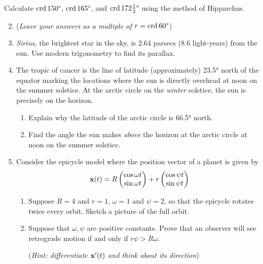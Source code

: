 \begin{exercises}{}{}
	\exstart %
	Calculate $\crd\ang{150}$, $\crd\ang{165}$, and $\crd\ang{172\tfrac 12}$ using the method of Hipparchus.\vspace{-5pt}
	\begin{enumerate}\setcounter{enumi}{1}
	  \item[](\emph{Leave your answers as a multiple of $r=\crd\ang{60}$})
	  
	  \item \emph{Sirius,} the brightest star in the sky, is 2.64 parsecs (8.6 light-years) from the sun. Use modern trigonometry to find its parallax.
	
		\item\label{exs:tropicstick1} The tropic of cancer is the line of latitude (approximately) \ang{23.5} north of the equator marking the locations where the sun is directly overhead at noon on the summer solstice.\footnotemark{} At the arctic circle on the \emph{winter} solstice, the sun is precisely on the horizon.
		\begin{enumerate}
		  \item Explain why the latitude of the arctic circle is \ang{66.5} north.
		  \item Find the angle the sun makes \emph{above} the horizon at the arctic circle at noon on the summer solstice.
		\end{enumerate}
	  
	  \item Consider the epicycle model where the position vector of a planet is given by
	  \[
	  	\vx(t) =R\twovec{\cos \omega t}{\sin \omega t} 
	  		+r\twovec{\cos \psi t}{\sin \psi t}
	  \]
	  \begin{enumerate}
	    \item Suppose $R=4$ and $r=1$, $\omega=1$ and $\psi=2$, so that the epicycle rotates twice every orbit. Sketch a picture of the full orbit.
	    \item Suppose that $\omega,\psi$ are positive constants. Prove that an observer will see retrograde motion if and only if $r\psi>R\omega$.\par
	  	(\emph{Hint: differentiate $\vx'(t)$ and think about its direction})
	  \end{enumerate}
	\end{enumerate}
\end{exercises}


